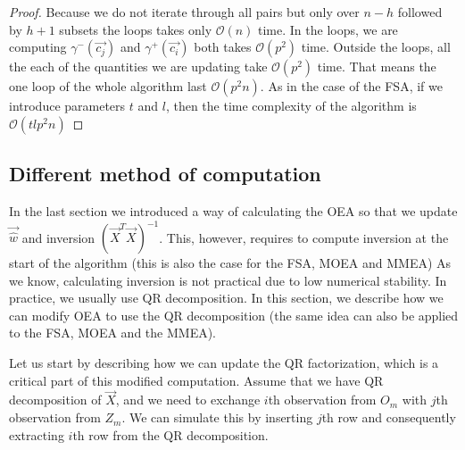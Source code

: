 \begin{proof}
    Because we do not iterate through all pairs but only over $n-h$ followed by $h+1$ subsets the loops takes only $\mathcal{O}(n)$ time. In the loops, we are computing $\gamma^{-}(\vec{c_j}) $ and $\gamma^{+}(\vec{c_i})$ both takes $\mathcal{O}(p^2)$ time. Outside the loops, all the each of the quantities we are updating take $\mathcal{O}(p^2)$ time.
That means the one loop of the whole algorithm last $\mathcal{O}(p^2n)$.
As in the case of the FSA, if we introduce parameters $t$ and $l$, then the time complexity of the algorithm is $\mathcal{O}(tlp^2n)$
\end{proof}








\subsection{Different method of computation} \label{differentcomputation}
In the last section we introduced a way of calculating the OEA so that we update $\vec{\hat{w}}$ and inversion $(\vec{X}^T \vec{X})^{-1}$. This, however, requires to compute inversion at the start of the algorithm (this is also the case for the FSA, MOEA and MMEA) As we know, calculating inversion is not practical due to low numerical stability. In practice, we usually use QR decomposition. In this section, we describe how we can modify OEA to use the QR decomposition (the same idea can also be applied to the FSA, MOEA and the MMEA). 

Let us start by describing how we can update the QR factorization, which is a critical part of this modified computation. Assume that we have QR decomposition of $\vec{X}$, and we need to exchange $i$th observation from $O_m$ with $j$th observation from $Z_m$. We can simulate this by inserting $j$th row and consequently extracting $i$th row from the QR decomposition. 




